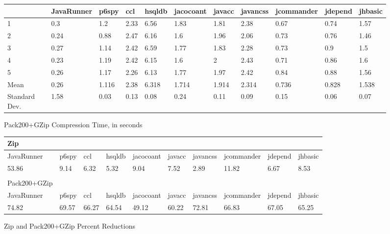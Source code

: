\documentclass{article}
\begin{document}
\begin{figure}
\caption{Pack200+GZip Compression Time, in seconds}
\begin{sideways}
\begin{tabular}{l l l l l l l l l l l }
	  & JavaRunner & p6spy & ccl & hsqldb & jacocoant & javacc & javancss & jcommander & jdepend & jhbasic \\ \hline
1	&0.3	&1.2&	2.33&	6.56	&1.83	&1.81	&2.38&	0.67	&0.74	&1.57\\
2	&0.24&	0.88&	2.47&	6.16&	1.6&	1.96&	2.06&	0.73&	0.76	&1.46\\
3	&0.27&	1.14&	2.42	&6.59&	1.77&	1.83	&2.28	&0.73	&0.9	&1.5\\
4	&0.23	&1.19&	2.42	&6.15&	1.6&	2	&2.43	&0.71&	0.86&	1.6\\
5	&0.26	&1.17&	2.26	&6.13&	1.77&	1.97&	2.42	&0.84	&0.88&	1.56\\
Mean&	0.26&	1.116&	2.38	&6.318	&1.714	&1.914&	2.314&	0.736&	0.828&	1.538\\
Standard Dev.&	1.58&0.03&	0.13&	0.08&	0.24&	0.11&	0.09&	0.15	&0.06&	0.07
\end{tabular}
\end{sideways}
\end{figure}

\begin{figure}
\caption{Zip and Pack200+GZip Percent Reductions}
\begin{sideways}
\begin{tabular}{l l l l l l l l l l }
Zip\\ \hline
	  JavaRunner & p6spy & ccl & hsqldb & jacocoant & javacc & javancss & jcommander & jdepend & jhbasic \\ \hline
53.86 &	9.14	&6.32&	5.32&	9.04&	7.52&	2.89&	11.82&	6.67&	8.53\\ \hline
\\
Pack200+GZip \\ \hline
JavaRunner & p6spy & ccl & hsqldb & jacocoant & javacc & javancss & jcommander & jdepend & jhbasic \\ \hline
74.82&	69.57&	66.27&	64.54&	49.12&	60.22&	72.81&	66.83&	67.05&	65.25
\end{tabular}
\end{sideways}
\end{figure}


\nocite{tanenbaum_steen_2007}





\end{document}
